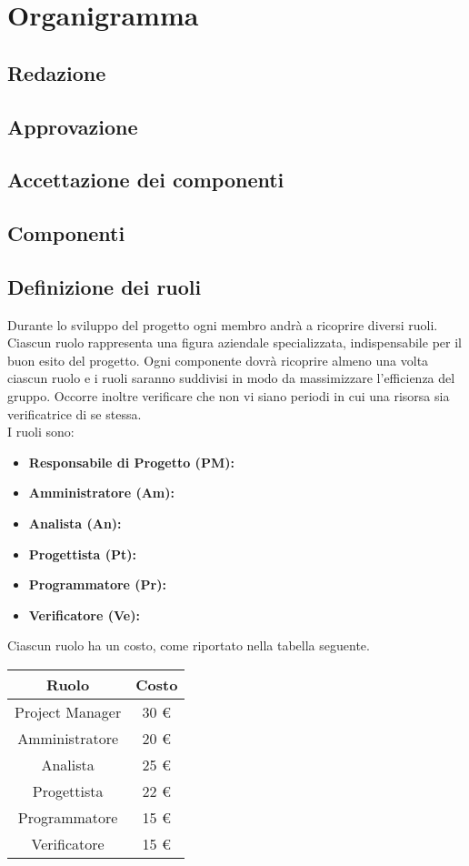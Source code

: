\section{Organigramma}
	\subsection{Redazione}
	\subsection{Approvazione}
	\subsection{Accettazione dei componenti}
	\subsection{Componenti}
	\subsection{Definizione dei ruoli}
		Durante lo sviluppo del progetto ogni membro andrà a ricoprire diversi ruoli. Ciascun ruolo rappresenta una figura aziendale specializzata, indispensabile per il buon esito del progetto. Ogni componente dovrà ricoprire almeno una volta ciascun ruolo e i ruoli saranno suddivisi in modo da massimizzare l'efficienza del gruppo. Occorre inoltre verificare che non vi siano periodi in cui una risorsa sia verificatrice di se stessa. \\
		I ruoli sono:
		\begin{itemize}
			\item \textbf{Responsabile di Progetto (PM):} \\
			\item \textbf{Amministratore (Am):} \\
			\item \textbf{Analista (An):} \\
			\item \textbf{Progettista (Pt):} \\
			\item \textbf{Programmatore (Pr):} \\
			\item \textbf{Verificatore (Ve):} \\
		\end{itemize}
		Ciascun ruolo ha un costo, come riportato nella tabella seguente. \\
		\begin{table}[H]
		\centering
		\begin{tabular}{|c|c|}
			\hline
			\textbf{Ruolo}		& \textbf{Costo} \\
			\hline
			Project Manager		& 30 €\\
			Amministratore		& 20 €\\
			Analista			& 25 €\\
			Progettista			& 22 €\\
			Programmatore		& 15 €\\
			Verificatore		& 15 €\\
			\hline
		\end{tabular}
		\end{table}